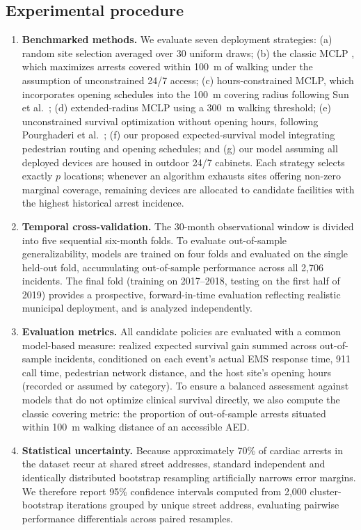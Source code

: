 \documentclass[11pt]{article}
\begin{document}
\subsection{Experimental procedure}
\begin{enumerate}
\item \textbf{Benchmarked methods.} We evaluate seven deployment strategies: (a) random site selection averaged over 30 uniform draws; (b) the classic MCLP \cite{church1974}, which maximizes arrests covered within 100~m of walking under the assumption of unconstrained 24/7 access; (c) hours-constrained MCLP, which incorporates opening schedules into the 100~m covering radius following Sun et al.\ \cite{sun2016}; (d) extended-radius MCLP using a 300~m walking threshold; (e) unconstrained survival optimization without opening hours, following Pourghaderi et al.\ \cite{pourghaderi2021}; (f) our proposed expected-survival model integrating pedestrian routing and opening schedules; and (g) our model assuming all deployed devices are housed in outdoor 24/7 cabinets. Each strategy selects exactly $p$ locations; whenever an algorithm exhausts sites offering non-zero marginal coverage, remaining devices are allocated to candidate facilities with the highest historical arrest incidence.
\item \textbf{Temporal cross-validation.} The 30-month observational window is divided into five sequential six-month folds. To evaluate out-of-sample generalizability, models are trained on four folds and evaluated on the single held-out fold, accumulating out-of-sample performance across all 2{,}706 incidents. The final fold (training on 2017--2018, testing on the first half of 2019) provides a prospective, forward-in-time evaluation reflecting realistic municipal deployment, and is analyzed independently.
\item \textbf{Evaluation metrics.} All candidate policies are evaluated with a common model-based measure: realized expected survival gain summed across out-of-sample incidents, conditioned on each event's actual EMS response time, 911 call time, pedestrian network distance, and the host site's opening hours (recorded or assumed by category). To ensure a balanced assessment against models that do not optimize clinical survival directly, we also compute the classic covering metric: the proportion of out-of-sample arrests situated within 100~m walking distance of an accessible AED.
\item \textbf{Statistical uncertainty.} Because approximately 70\% of cardiac arrests in the dataset recur at shared street addresses, standard independent and identically distributed bootstrap resampling artificially narrows error margins. We therefore report 95\% confidence intervals computed from 2{,}000 cluster-bootstrap iterations grouped by unique street address, evaluating pairwise performance differentials across paired resamples.

\end{enumerate}
\end{document}
